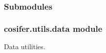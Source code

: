 \documentclass[letterpaper,10pt,english]{sphinxmanual}
\begin{document}
\subsubsection{Submodules}
\label{\detokenize{_modules/cosifer.utils:submodules}}

\subsubsection{cosifer.utils.data module}
\label{\detokenize{_modules/cosifer.utils:module-cosifer.utils.data}}\label{\detokenize{_modules/cosifer.utils:cosifer-utils-data-module}}
Data utilities.
\end{document}
